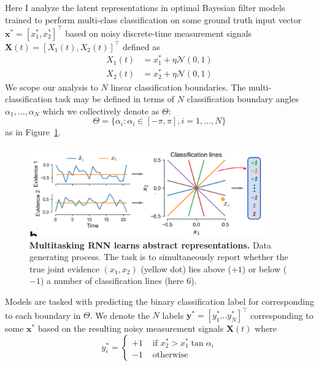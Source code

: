 \documentclass[12pt]{article}
\begin{document}
Here I analyze the latent representations in optimal Bayesian filter models
trained to perform multi-class classification on some ground truth input vector 
$\mathbf x^* = [x_1^*, x_2^*]^\top$ 
based on noisy discrete-time measurement signals
$\mathbf X(t) = [X_1(t), X_2(t)]^\top$ defined as  
\begin{align}
	\label{eqn:def_noisy_input}
	X_1(t) &= x_1^* + \eta \mathcal N(0, 1) \\
	X_2(t) &= x_2^* + \eta \mathcal N(0, 1) 
\end{align}
We scope our analysis to $N$ linear classification boundaries.
The multi-classification task may be defined in terms of $N$ classification
boundary angles $\alpha_1, \dots, \alpha_N $ which we collectively denote as $\Theta$: 
\begin{equation}
	\label{eqn:boundaries}
	\Theta = \{\alpha_i : \alpha_i \in [-\pi, \pi], i = 1, \dots, N\}
\end{equation}
as in Figure~\ref{fig:2a}. 
\begin{figure}[h! tbp]
	\centering 
	\includegraphics[width=0.9\textwidth]{media/multitask_fig2a.png}
	\caption[Multitasking RNN learns abstract representations]{\textbf{Multitasking RNN learns abstract representations. } Data generating process. The task is to simultaneously report whether the true joint evidence $(x_1,x_2)$ (yellow dot) lies above ($+1$) or below ($-1$) a number of classification lines (here 6).}
	\label{fig:2a}
\end{figure}
Models are tasked with predicting the binary classification label for corresponding to each boundary in $\Theta$. 
We denote the $N$ labels $\mathbf y^* = [y_1^* \dots y_N^*]^\top$ 
corresponding to some $\mathbf x^*$ based on the resulting noisy measurement
signals $\mathbf X(t)$ where 
\begin{equation}
	\label{eqn:def_multiclass_output}
	y_i^* = \begin{cases}
		+1 & \text{ if $x_2^* > x_1^* \tan \alpha_i$} \\
		-1 & \text{ otherwise }
	\end{cases}
\end{equation}
\end{document}
